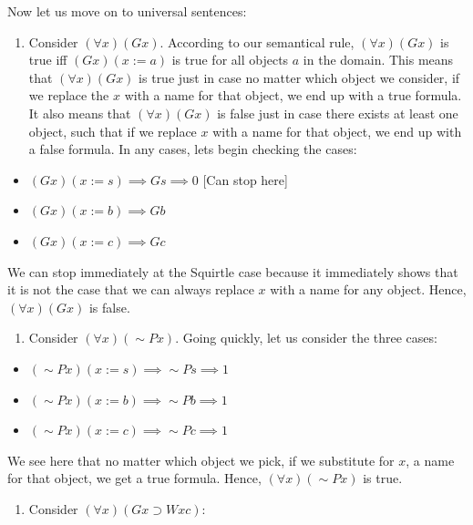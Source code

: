 \documentclass[
]{book}
\providecommand{\tightlist}{%
  \setlength{\itemsep}{0pt}\setlength{\parskip}{0pt}}
\begin{document}
Now let us move on to universal sentences:

\begin{enumerate}
\def\labelenumi{\arabic{enumi}.}
\tightlist
\item
  Consider \((\forall x)(Gx)\). According to our semantical rule, \((\forall x)(Gx)\) is true iff \((Gx)(x:=a)\) is true for all objects \(a\) in the domain. This means that \((\forall x)(Gx)\) is true just in case no matter which object we consider, if we replace the \(x\) with a name for that object, we end up with a true formula. It also means that \((\forall x)(Gx)\) is false just in case there exists at least one object, such that if we replace \(x\) with a name for that object, we end up with a false formula. In any cases, lets begin checking the cases:
\end{enumerate}

\begin{itemize}
\tightlist
\item
  \((Gx)(x:= s) \implies Gs \implies 0\) {[}Can stop here{]}
\item
  \((Gx)(x:= b) \implies Gb\)
\item
  \((Gx)(x:= c) \implies Gc\)
\end{itemize}

We can stop immediately at the Squirtle case because it immediately shows that it is not the case that we can always replace \(x\) with a name for any object. Hence, \((\forall x)(Gx)\) is false.

\begin{enumerate}
\def\labelenumi{\arabic{enumi}.}
\setcounter{enumi}{1}
\tightlist
\item
  Consider \((\forall x)(\sim Px)\). Going quickly, let us consider the three cases:
\end{enumerate}

\begin{itemize}
\tightlist
\item
  \((\sim Px)(x:=s) \implies \sim Ps \implies 1\)
\item
  \((\sim Px)(x:=b) \implies \sim Pb \implies 1\)
\item
  \((\sim Px)(x:=c) \implies \sim Pc \implies 1\)
\end{itemize}

We see here that no matter which object we pick, if we substitute for \(x\), a name for that object, we get a true formula. Hence, \((\forall x)(\sim Px)\) is true.

\begin{enumerate}
\def\labelenumi{\arabic{enumi}.}
\setcounter{enumi}{2}
\tightlist
\item
  Consider \((\forall x)(Gx \supset Wxc)\):
\end{enumerate}
\end{document}
